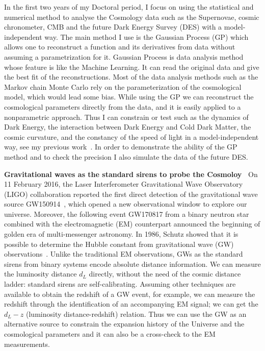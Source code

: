\documentclass[11pt,letterpaper,sans]{moderncv}   %
\begin{document}
\vspace{2mm}
\noindent
In the first two years of my Doctoral period, I focus on using the statistical and numerical method to analyse the Cosmology data such as the Supernovae, cosmic chronometer, CMB and the future Dark Energy Survey (DES) with a model-independent way. The main method I use is the Gaussian Process (GP) which allows one to reconstruct a function and its derivatives from data without assuming a parametrization for it.
Gaussian Process is data analysis method whose feature is like the Machine Learning. It can read the original data and give the best fit of the reconstructions. Most of the data analysis methods such as the Markov chain Monte Carlo rely on the parameterization of the cosmological model, which would lead some bias.  While using the GP we can reconstruct the cosmological parameters directly from the data, and it is easily applied to a  nonparametric approach.
Thus I can constrain or test such as the dynamics of Dark Energy, the interaction between Dark Energy and Cold Dark Matter, the cosmic curvature, and the constancy of the speed of light in a model-independent way, see my previous work~\cite{Cai:2015zoa,Cai:2015pia,Cai:2016vmn}. In order to demonstrate the ability of the GP method and to check the precision I also simulate the data of the future DES.

\vspace{2mm}
\noindent
\textcolor{color1}{\textbf{Gravitational waves as the standard sirens to probe the Cosmoloy~\cite{Cai:2016sby,Cai:2017yww,Yang:2017bkv,Cai:2017aea}}} On 11 February 2016, the Laser Interferometer Gravitational Wave Observatory (LIGO) collaboration reported the first direct detection of the gravitational wave source GW150914~\cite{Abbott:2016blz}, which opened a new observational window to explore our universe. Moreover, the following event GW170817 from a binary neutron star combined with the electromagnetic (EM) counterpart announced the beginning of golden era of multi-messenger astronomy. In 1986, Schutz showed that it is possible to determine the Hubble constant from gravitational wave (GW) observations~\cite{Schutz:1986gp}.
Unlike the traditional EM observations, GWs as the standard sirens from binary systems encode absolute distance information. We can measure the luminosity distance $d_L$ directly, without the need of the cosmic distance ladder: standard sirens are self-calibrating. Assuming other techniques are available to obtain the redshift  of a GW event, for example, we can measure the redshift through the identification of an accompanying EM signal; we can get the $d_L-z$ (luminosity distance-redshift) relation. Thus we can use the GW as an alternative source to constrain the expansion history of the Universe and the cosmological parameters and it can also be a cross-check to the EM measurements.
\end{document}
